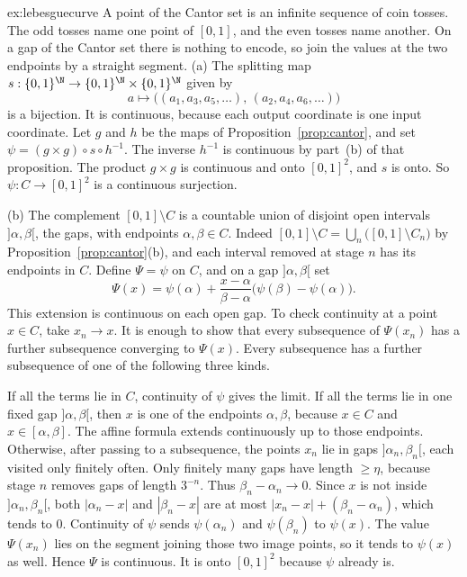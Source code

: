 \begin{solution}{ex:lebesguecurve}
\idea A point of the Cantor set is an infinite sequence of coin tosses. The odd tosses name one point of $[0,1]$, and the even tosses name another. On a gap of the Cantor set there is nothing to encode, so join the values at the two endpoints by a straight segment.
\writeup (a) The splitting map $s:\{0,1\}^\N\to\{0,1\}^\N\times\{0,1\}^\N$ given by
\[a\mapsto\bigl((a_1,a_3,a_5,\ldots),\,(a_2,a_4,a_6,\ldots)\bigr)\]
is a bijection. It is continuous, because each output coordinate is one input coordinate. Let $g$ and $h$ be the maps of Proposition~\ref{prop:cantor}, and set $\psi=(g\times g)\circ s\circ h^{-1}$. The inverse $h^{-1}$ is continuous by part~(b) of that proposition. The product $g\times g$ is continuous and onto $[0,1]^2$, and $s$ is onto. So $\psi:C\to[0,1]^2$ is a continuous surjection.

(b) The complement $[0,1]\setminus C$ is a countable union of disjoint open intervals $]\alpha,\beta[$, the gaps, with endpoints $\alpha,\beta\in C$. Indeed $[0,1]\setminus C=\bigcup_n\bigl([0,1]\setminus C_n\bigr)$ by Proposition~\ref{prop:cantor}(b), and each interval removed at stage $n$ has its endpoints in $C$. Define $\Psi=\psi$ on $C$, and on a gap $]\alpha,\beta[$ set
\[\Psi(x)=\psi(\alpha)+\frac{x-\alpha}{\beta-\alpha}\bigl(\psi(\beta)-\psi(\alpha)\bigr).\]
This extension is continuous on each open gap. To check continuity at a point $x\in C$, take $x_n\to x$. It is enough to show that every subsequence of $\Psi(x_n)$ has a further subsequence converging to $\Psi(x)$. Every subsequence has a further subsequence of one of the following three kinds.

If all the terms lie in $C$, continuity of $\psi$ gives the limit. If all the terms lie in one fixed gap $]\alpha,\beta[$, then $x$ is one of the endpoints $\alpha,\beta$, because $x\in C$ and $x\in[\alpha,\beta]$. The affine formula extends continuously up to those endpoints. Otherwise, after passing to a subsequence, the points $x_n$ lie in gaps $]\alpha_n,\beta_n[$, each visited only finitely often. Only finitely many gaps have length $\ge\eta$, because stage $n$ removes gaps of length $3^{-n}$. Thus $\beta_n-\alpha_n\to0$. Since $x$ is not inside $]\alpha_n,\beta_n[$, both $|\alpha_n-x|$ and $|\beta_n-x|$ are at most $|x_n-x|+(\beta_n-\alpha_n)$, which tends to $0$. Continuity of $\psi$ sends $\psi(\alpha_n)$ and $\psi(\beta_n)$ to $\psi(x)$. The value $\Psi(x_n)$ lies on the segment joining those two image points, so it tends to $\psi(x)$ as well. Hence $\Psi$ is continuous. It is onto $[0,1]^2$ because $\psi$ already is.
\end{solution}

